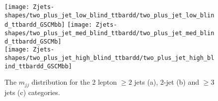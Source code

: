 \begin{figure}[!htb]
  \centering
  \texttt{[image: Zjets-shapes/two\_plus\_jet\_low\_blind\_ttbardd/two\_plus\_jet\_low\_blind\_ttbardd\_GSCMbb]}
  \texttt{[image: Zjets-shapes/two\_plus\_jet\_med\_blind\_ttbardd/two\_plus\_jet\_med\_blind\_ttbardd\_GSCMb]} \\
  \texttt{[image: Zjets-shapes/two\_plus\_jet\_high\_blind\_ttbardd/two\_plus\_jet\_high\_blind\_ttbardd\_GSCMbb]}
  \caption{The $m_{jj}$ distribution for the 2 lepton $\geq 2$ jets (a), 2-jet
    (b) and $\ge 3$ jets (c) categories.}
  \label{fig:zjets-mbb-shape-ptv-range}
\end{figure}